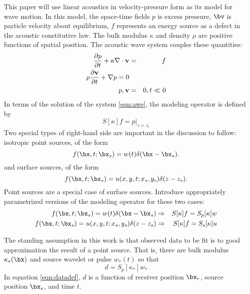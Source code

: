 This paper will use linear acoustics in velocity-pressure form as its
model for wave motion. In this model, the space-time fields $p$ is excess
pressure, $\bv$ is particle velocity about equilibrium, $f$
represents an energy source as a defect in the acoustic constitutive
law. The bulk modulus $\kappa$ and density $\rho$ are positive functions of
spatial position. The acoustic wave system couples these quantities:
\begin{eqnarray}
\label{eqn:awe}
\frac{\partial p}{\partial t} + \kappa \nabla \cdot {\bf v} &=&
                                                                f \nonumber\\
\rho \frac{\partial {\bf v}}{\partial t} + \nabla p = 0 \nonumber\\
p,{\bf v}&=&0, t \ll 0
\end{eqnarray}
In terms of the solution of the system \ref{eqn:awe}, the modeling
operator is defined by
\begin{equation}
\label{eqn:fwd}
S[\kappa]f = p|_{z=z_r}
\end{equation}
Two special types of right-hand side are important in the discussion
to follow: isotropic point sources, of the form
\begin{equation}
  \label{eqn:ipr}
  f(\bx,t;\bx_s) = w(t)\delta(\bx-\bx_s).  
\end{equation}
and surface sources, of the form
\begin{equation}
  \label{eqn:ss}
  f(\bx,t;\bx_s) = u(x,y,t;x_s,y_s)\delta(z-z_s). 
\end{equation}
Point sources are a special case of surface sources. Introduce appropriately
parametrized versions of the modeling operator for these two cases:
\begin{eqnarray}
  \label{eqn:defpt}
 f(\bx,t;\bx_s) = w(t)\delta(\bx-\bx_s) & \Rightarrow & S[\kappa]f = S_p
  [\kappa]w\\ 
  \label{eqn:defss}
f(\bx,t;\bx_s) = u(x,y,t;x_s,y_s)\delta(z-z_s) & \Rightarrow & S[\kappa]f =
  S_s[\kappa]u
\end{eqnarray}

The standing assumption in this work is that observed data to be fit
is to good approximation the result of a point source. That is, there
are bulk modulus $\kappa_*(\bx)$ and source wavelet or pulse $w_*(t)$
so that
\begin{equation}
  \label{eqn:datadef}
  d = S_p[\kappa_*]w_*
\end{equation}
In equation \ref{eqn:datadef}, $d$ is a function of receiver position
$\bx_r$, source position $\bx_s$, and time $t$.

